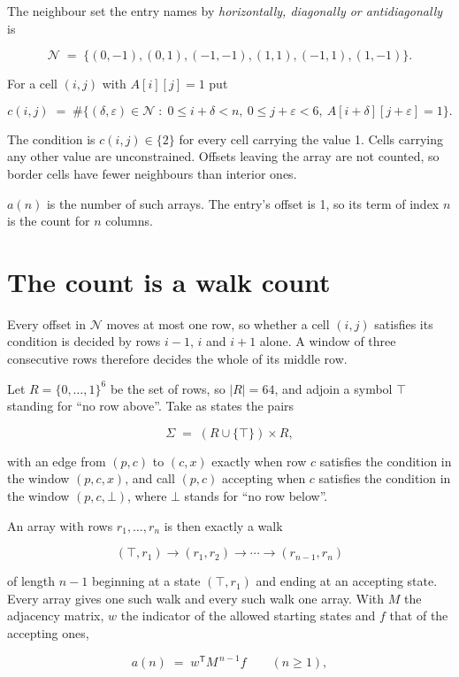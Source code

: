 \documentclass[11pt]{article}
\theoremstyle{definition}
\begin{document}
The neighbour set the entry names by {\itshape horizontally, diagonally or antidiagonally} is

\[\mathcal{N} \;=\; \{(0,-1), (0,1), (-1,-1), (1,1), (-1,1), (1,-1)\}.\]

For a cell $(i,j)$ with $A[i][j] = 1$ put

\[c(i,j) \;=\; \#\bigl\{(\delta,\varepsilon)\in\mathcal{N} \;:\; 0\le i+\delta<n,\ 0\le j+\varepsilon<6,\ A[i+\delta][j+\varepsilon] = 1\bigr\}.\]

The condition is $c(i,j) \in \{2\}$ for every cell carrying the value 1. Cells carrying any other value are unconstrained. Offsets leaving the array are not counted, so border cells have fewer neighbours than interior ones.

$a(n)$ is the number of such arrays. The entry's offset is 1, so its term of index $n$ is the count for $n$ columns.

\section{The count is a walk count}

Every offset in $\mathcal{N}$ moves at most one row, so whether a cell $(i,j)$ satisfies its condition is decided by rows $i-1$, $i$ and $i+1$ alone. A window of three consecutive rows therefore decides the whole of its middle row.

Let $R = \{0,\dots,1\}^{6}$ be the set of rows, so $|R| = 64$, and adjoin a symbol $\top$ standing for ``no row above''. Take as states the pairs

\[\Sigma \;=\; (R \cup \{\top\}) \times R,\]

with an edge from $(p,c)$ to $(c,x)$ exactly when row $c$ satisfies the condition in the window $(p,c,x)$, and call $(p,c)$ accepting when $c$ satisfies the condition in the window $(p,c,\bot)$, where $\bot$ stands for ``no row below''.

An array with rows $r_1,\dots,r_n$ is then exactly a walk

\[(\top,r_1) \to (r_1,r_2) \to \cdots \to (r_{n-1},r_n)\]

of length $n-1$ beginning at a state $(\top,r_1)$ and ending at an accepting state. Every array gives one such walk and every such walk one array. With $M$ the adjacency matrix, $w$ the indicator of the allowed starting states and $f$ that of the accepting ones,

\[a(n) \;=\; w^{\mathsf T} M^{\,n-1} f \qquad (n \ge 1),\]
\end{document}

